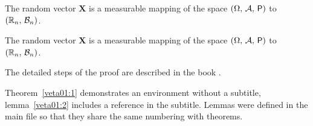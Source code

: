 \begin{veta}\label{veta01:1}
  The random vector $\bm X$ is a measurable mapping of the space 
  $(\Omega,\,\mathcal{A},\,\operatorname{\textsf{P}})$ to $(\mathbb{R}_n,\,\mathcal{B}_n)$.
\end{veta}

\begin{lemma}\label{veta01:2}
  The random vector $\bm X$ is a measurable mapping of the space 
  $(\Omega,\,\mathcal{A},\,\operatorname{\textsf{P}})$ to $(\mathbb{R}_n,\,\mathcal{B}_n)$.
\end{lemma}
\begin{dukaz}
  The detailed steps of the proof are described in the book \citet[p.
  29]{Andel07}. 
\end{dukaz}
Theorem~\ref{veta01:1} demonstrates an environment without a subtitle,
lemma~\ref{veta01:2} includes a reference in the subtitle. Lemmas were
defined in the main file so that they share the same numbering with
theorems.



